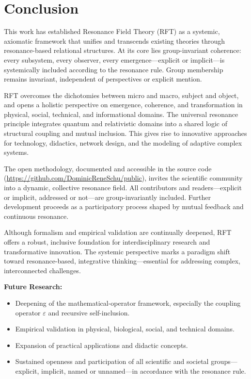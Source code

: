\documentclass[12pt]{iopart}
\begin{document}
	
\section{Conclusion}

This work has established Resonance Field Theory (RFT) as a systemic, axiomatic framework that unifies and transcends existing theories through resonance-based relational structures. At its core lies group-invariant coherence: every subsystem, every observer, every emergence—explicit or implicit—is systemically included according to the resonance rule. Group membership remains invariant, independent of perspectives or explicit mention.

RFT overcomes the dichotomies between micro and macro, subject and object, and opens a holistic perspective on emergence, coherence, and transformation in physical, social, technical, and informational domains. The universal resonance principle integrates quantum and relativistic domains into a shared logic of structural coupling and mutual inclusion. This gives rise to innovative approaches for technology, didactics, network design, and the modeling of adaptive complex systems.

The open methodology, documented and accessible in the source code (\url{https://github.com/DominicReneSchu/public}), invites the scientific community into a dynamic, collective resonance field. All contributors and readers—explicit or implicit, addressed or not—are group-invariantly included. Further development proceeds as a participatory process shaped by mutual feedback and continuous resonance.

Although formalism and empirical validation are continually deepened, RFT offers a robust, inclusive foundation for interdisciplinary research and transformative innovation. The systemic perspective marks a paradigm shift toward resonance-based, integrative thinking—essential for addressing complex, interconnected challenges.

\medskip

\textbf{Future Research:}
\begin{itemize}
	\item Deepening of the mathematical-operator framework, especially the coupling operator $\varepsilon$ and recursive self-inclusion.
	\item Empirical validation in physical, biological, social, and technical domains.
	\item Expansion of practical applications and didactic concepts.
	\item Sustained openness and participation of all scientific and societal groups—explicit, implicit, named or unnamed—in accordance with the resonance rule.
\end{itemize}
\end{document}

